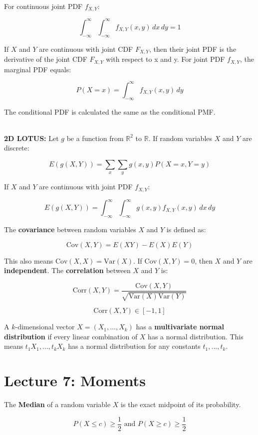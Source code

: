 \documentclass[12pt]{article}
\begin{document}
\newpage
\noindent
For continuous joint PDF $f_{X, Y}$:

\[ \int_{-\infty}^{\infty} \int_{-\infty}^{\infty} f_{X, Y}(x, y) \,dx \,dy = 1 \]

\noindent
If $X$ and $Y$ are continuous with joint CDF $F_{X, Y}$, then their joint PDF is the derivative of the joint CDF $F_{X, Y}$ with respect to x and y.
For joint PDF $f_{X, Y}$, the marginal PDF equals:

\[ P(X = x) = \int_{-\infty}^{\infty} f_{X, Y}(x, y) \,dy \]

\noindent
The conditional PDF is calculated the same as the conditional PMF.

\noindent
\\
\textbf{2D LOTUS:}
Let $g$ be a function from $\mathbb{R}^2$ to $\mathbb{R}$.
If random variables $X$ and $Y$ are discrete:

\[ E(g(X, Y)) = \sum_x \sum_y g(x, y) P(X = x, Y = y) \]

\noindent
If $X$ and $Y$ are continuous with joint PDF $f_{X, Y}$:

\[ E(g(X, Y)) = \int_{-\infty}^{\infty} \int_{-\infty}^{\infty} g(x, y) f_{X, Y}(x, y) \,dx \,dy \]

\noindent
The \textbf{covariance} between random variables $X$ and $Y$ is defined as:

\[ \text{Cov}(X, Y) = E(XY) - E(X)E(Y) \]

\noindent
This also means $\text{Cov}(X, X) = \text{Var}(X)$.
If $\text{Cov}(X, Y) = 0$, then $X$ and $Y$ are \textbf{independent}.
The \textbf{correlation} between $X$ and $Y$ is:

\[ \text{Corr}(X, Y) = \frac{\text{Cov}(X, Y)}{\sqrt{\text{Var}(X)\text{Var}(Y)}} \]

\[ \text{Corr}(X, Y) \in [-1, 1] \]

\noindent
A $k$-dimensional vector $X = (X_1, ... , X_k)$ has a \textbf{multivariate normal distribution} if every linear combination of $X$ has a normal distribution.
This means $t_1 X_1, ... , t_k X_k$ has a normal distribution for any constants $t_1, ... , t_k$.

%
%
\newpage
\section*{Lecture 7: Moments}
The \textbf{Median} of a random variable $X$ is the exact midpoint of its probability.

\[ P(X \leq c) \geq \frac{1}{2} \text{  and  } P(X \geq c) \geq \frac{1}{2} \]
\end{document}
